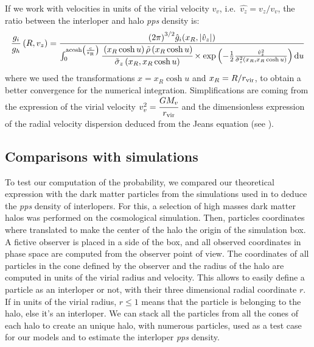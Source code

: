 If we work with velocities in units of the virial velocity $v_v$, i.e.\
$\hat{v_z}=v_z/v_v$, the ratio between the interloper and halo \emph{pps}
density is:
%
\begin{equation}
    \label{eq:gi_over_gh}
    \frac{g_i}{g_h}\left(R,v_z\right)=
    \frac{{\left(2\pi\right)}^{3/2}\hat{g}_i{(x_R,|\hat{v}_z|)}}
        {\int_0^{\rm{acosh}\left(\frac{c}{x_R}\right)}
            \cfrac{\left(x_R\cosh{u}\right)\tilde\rho\left(x_R\cosh{u}\right)}
            {{\tilde\sigma}_z\left(x_R,x_R\cosh{u}\right)}
    \times\exp\left(-\frac{1}{2}\frac{{\hat{v}_z}^2}
    {{\tilde\sigma}_z^2\left(x_R,x_R\cosh{u}\right)}\right){\rm{d}} u}
\end{equation}
%
where we used the transformations $x=x_R\cosh u$ and $x_R=R/r_{\rm vir}$, to obtain a
better convergence for the numerical integration. Simplifications are coming
from the expression of the virial velocity $v_v^2=\cfrac{G M_v}{r_{\rm vir}}$
and the dimensionless expression of the radial velocity dispersion deduced from
the Jeans equation (see \bartrefappendix{profiles}).

\subsection{Comparisons with simulations}
\label{sub:comparisons_with_simulations}

To test our computation of the probability, we compared our theoretical
expression with the dark matter particles from the simulations used in
\citet{MBM+10} to deduce the \emph{pps} density of interlopers. For this, a
selection of high masses dark matter halos was performed on the cosmological
simulation. Then, particles coordinates where translated to make the center of
the halo the origin of the simulation box. A fictive observer is placed in a
side of the box, and all observed coordinates in phase space are computed from
the observer point of view. The coordinates of all particles in the cone
defined by the observer and the radius of the halo are computed in units of the
virial radius and velocity. This allows to easily define a particle as an
interloper or not, with their three dimensional radial coordinate $r$. If in units
of the virial radius, $r\leqslant1$ means that the particle is belonging to the
halo, else it's an interloper. We can stack all the particles from all the
cones of each halo to create an unique halo, with numerous particles, used as a
test case for our models and to estimate the interloper \emph{pps} density.

